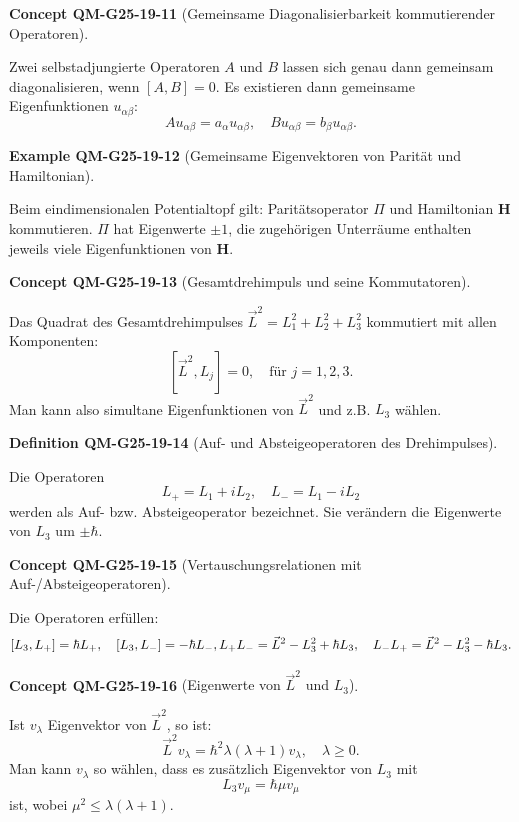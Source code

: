 \documentclass[10pt, letterpaper]{article}
\newcommand{\CustomHeading}[3]{%
  \par\medskip\noindent%
  \textbf{#1 #2} \textnormal{(#3)}.\enskip%
}
\newenvironment{DEF}[2]{\CustomHeading{Definition}{#1}{#2}}{}
\newenvironment{EXA}[2]{\CustomHeading{Example}{#1}{#2}}{}
\newenvironment{CONC}[2]{\CustomHeading{Concept}{#1}{#2}}{}
\begin{document}
\begin{CONC}{QM-G25-19-11}{Gemeinsame Diagonalisierbarkeit kommutierender Operatoren}
Zwei selbstadjungierte Operatoren $A$ und $B$ lassen sich genau dann gemeinsam diagonalisieren, wenn $[A, B] = 0$. Es existieren dann gemeinsame Eigenfunktionen $u_{\alpha \beta}$:
$$
A u_{\alpha \beta} = a_\alpha u_{\alpha \beta}, \quad B u_{\alpha \beta} = b_\beta u_{\alpha \beta}.
$$
\end{CONC}

\begin{EXA}{QM-G25-19-12}{Gemeinsame Eigenvektoren von Parität und Hamiltonian}
Beim eindimensionalen Potentialtopf gilt: Paritätsoperator $\Pi$ und Hamiltonian $\mathbf{H}$ kommutieren. $\Pi$ hat Eigenwerte $\pm1$, die zugehörigen Unterräume enthalten jeweils viele Eigenfunktionen von $\mathbf{H}$.
\end{EXA}

\begin{CONC}{QM-G25-19-13}{Gesamtdrehimpuls und seine Kommutatoren}
Das Quadrat des Gesamtdrehimpulses $\vec{L}^2 = L_1^2 + L_2^2 + L_3^2$ kommutiert mit allen Komponenten:
$$
[\vec{L}^2, L_j] = 0, \quad \text{für } j = 1, 2, 3.
$$
Man kann also simultane Eigenfunktionen von $\vec{L}^2$ und z.B. $L_3$ wählen.
\end{CONC}

\begin{DEF}{QM-G25-19-14}{Auf- und Absteigeoperatoren des Drehimpulses}
Die Operatoren
$$
L_+ = L_1 + i L_2, \quad L_- = L_1 - i L_2
$$
werden als Auf- bzw. Absteigeoperator bezeichnet. Sie verändern die Eigenwerte von \(L_3\) um \(\pm\hbar\).
\end{DEF}

\begin{CONC}{QM-G25-19-15}{Vertauschungsrelationen mit Auf-/Absteigeoperatoren}
Die Operatoren erfüllen:
$$
[L_3, L_+] = \hbar L_+, \quad [L_3, L_-] = -\hbar L_-, \\
L_+ L_- = \vec{L}^2 - L_3^2 + \hbar L_3, \quad L_- L_+ = \vec{L}^2 - L_3^2 - \hbar L_3.
$$
\end{CONC}

\begin{CONC}{QM-G25-19-16}{Eigenwerte von \(\vec{L}^2\) und \(L_3\)}
Ist \(v_\lambda\) Eigenvektor von \(\vec{L}^2\), so ist:
$$
\vec{L}^2 v_\lambda = \hbar^2 \lambda(\lambda + 1) v_\lambda, \quad \lambda \geq 0.
$$
Man kann \(v_\lambda\) so wählen, dass es zusätzlich Eigenvektor von \(L_3\) mit
$$
L_3 v_\mu = \hbar \mu v_\mu
$$
ist, wobei \(\mu^2 \leq \lambda(\lambda + 1)\).
\end{CONC}
\end{document}
